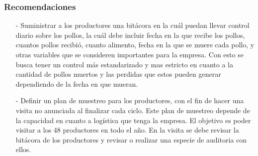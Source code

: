 \documentclass[11pt]{beamer}
\begin{document}
\begin{frame}
\frametitle{Recomendaciones}
\begin{itemize}
\item[-]Suministrar a los productores una bitácora en la cuál puedan llevar control diario sobre los pollos, la cuál debe incluir fecha en la que recibe los pollos, cuantos pollos recibió, cuanto alimento, fecha en la que se muere cada pollo, y otras variables que se consideren importantes para la empresa. Con esto se busca tener un control más estandarizado y mas estricto en cuanto a la cantidad de pollos muertos y las perdidas que estos pueden generar dependiendo de la fecha en que mueran.
\item[-]Definir un plan de muestreo para los productores, con el fin de hacer una visita no anunciada al finalizar cada ciclo. Este plan de muestreo depende de la capacidad en cuanto a logística que tenga la empresa. El objetivo es poder visitar a los 48 productores en todo el año. En la visita se debe revisar la bitácora de los productores y revisar o realizar una especie de auditoria con ellos. 
\end{itemize}
\end{frame}
\end{document}
